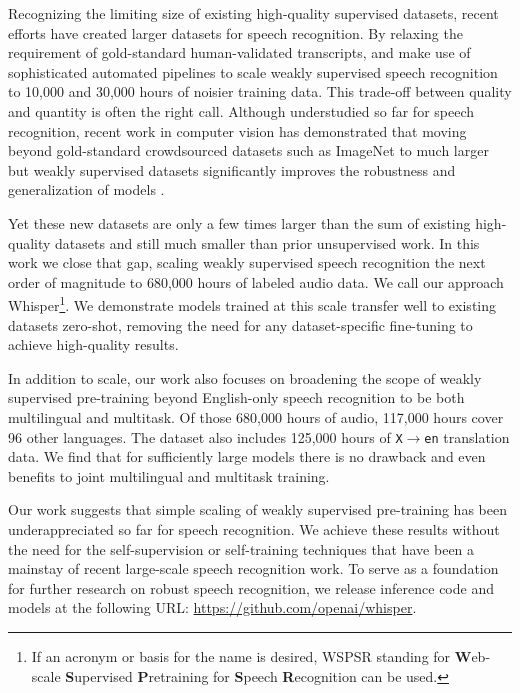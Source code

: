 Recognizing the limiting size of existing high-quality supervised datasets, recent efforts have created larger datasets for speech recognition. By relaxing the requirement of gold-standard human-validated transcripts, \citet{chen2021gigaspeech} and \citet{galvez2021people} make use of sophisticated automated pipelines to scale weakly supervised speech recognition to 10,000 and 30,000 hours of noisier training data. This trade-off between quality and quantity is often the right call. Although understudied so far for speech recognition, recent work in computer vision has demonstrated that moving beyond gold-standard crowdsourced datasets such as ImageNet \cite{russakovsky2015imagenet} to much larger but weakly supervised datasets significantly improves the robustness and generalization of models \cite{mahajan2018exploring,kolesnikov2020big}.

Yet these new datasets are only a few times larger than the sum of existing high-quality datasets and still much smaller than prior unsupervised work. In this work we close that gap, scaling weakly supervised speech recognition the next order of magnitude to 680,000 hours of labeled audio data. We call our approach Whisper\footnote{If an acronym or basis for the name is desired, WSPSR standing for \textbf{W}eb-scale \textbf{S}upervised \textbf{P}retraining for \textbf{S}peech \textbf{R}ecognition can be used.}. We demonstrate models trained at this scale transfer well to existing datasets zero-shot, removing the need for any dataset-specific fine-tuning to achieve high-quality results.

In addition to scale, our work also focuses on broadening the scope of weakly supervised pre-training beyond English-only speech recognition to be both multilingual and multitask. Of those 680,000 hours of audio, 117,000 hours cover 96 other languages. The dataset also includes 125,000 hours of \texttt{X$\rightarrow$en} translation data. We find that for sufficiently large models there is no drawback and even benefits to joint multilingual and multitask training.

Our work suggests that simple scaling of weakly supervised pre-training has been underappreciated so far for speech recognition. We achieve these results without the need for the self-supervision or self-training techniques that have been a mainstay of recent large-scale speech recognition work. To serve as a foundation for further research on robust speech recognition, we release inference code and models at the following URL: \url{https://github.com/openai/whisper}.

